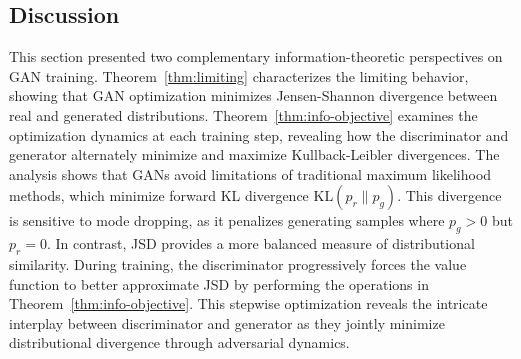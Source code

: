 \subsection{Discussion}
This section presented two complementary information-theoretic perspectives on GAN training. Theorem~\ref{thm:limiting} characterizes the limiting behavior, showing that GAN optimization minimizes Jensen-Shannon divergence between real and generated distributions. Theorem~\ref{thm:info-objective} examines the optimization dynamics at each training step, revealing how the discriminator and generator alternately minimize and maximize Kullback-Leibler divergences.
The analysis shows that GANs avoid limitations of traditional maximum likelihood methods, which minimize forward KL divergence $\text{KL}(p_r \| p_g)$. This divergence is sensitive to mode dropping, as it penalizes generating samples where $p_g > 0$ but $p_r = 0$. In contrast, JSD provides a more balanced measure of distributional similarity.
During training, the discriminator progressively forces the value function to better approximate JSD by performing the operations in Theorem~\ref{thm:info-objective}. This stepwise optimization reveals the intricate interplay between discriminator and generator as they jointly minimize distributional divergence through adversarial dynamics.
